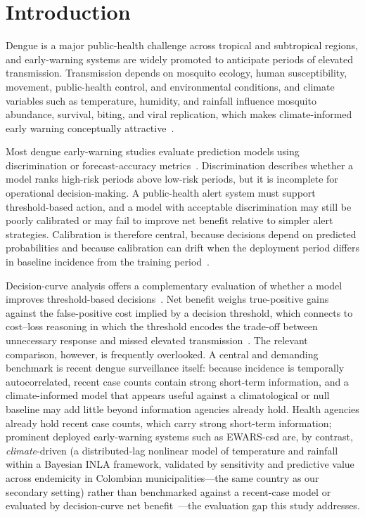 \documentclass[11pt,a4paper]{article}
\begin{document}
\section{Introduction}

Dengue is a major public-health challenge across tropical and subtropical regions, and early-warning systems are widely promoted to anticipate periods of elevated transmission. Transmission depends on mosquito ecology, human susceptibility, movement, public-health control, and environmental conditions, and climate variables such as temperature, humidity, and rainfall influence mosquito abundance, survival, biting, and viral replication, which makes climate-informed early warning conceptually attractive~\cite{Mordecai2017,Huber2018}.

Most dengue early-warning studies evaluate prediction models using discrimination or forecast-accuracy metrics~\cite{Johansson2019,Baharom2022,HussainAlkhateeb2021,Lowe2021}. Discrimination describes whether a model ranks high-risk periods above low-risk periods, but it is incomplete for operational decision-making. A public-health alert system must support threshold-based action, and a model with acceptable discrimination may still be poorly calibrated or may fail to improve net benefit relative to simpler alert strategies. Calibration is therefore central, because decisions depend on predicted probabilities and because calibration can drift when the deployment period differs in baseline incidence from the training period~\cite{VanCalster2019,VanCalster2023,SteyerbergVergouwe2014}.

Decision-curve analysis offers a complementary evaluation of whether a model improves threshold-based decisions~\cite{Vickers2006,Vickers2016,Vickers2019}. Net benefit weighs true-positive gains against the false-positive cost implied by a decision threshold, which connects to cost--loss reasoning in which the threshold encodes the trade-off between unnecessary response and missed elevated transmission~\cite{Murphy1985,Tozan2023}. The relevant comparison, however, is frequently overlooked. A central and demanding benchmark is recent dengue surveillance itself: because incidence is temporally autocorrelated, recent case counts contain strong short-term information, and a climate-informed model that appears useful against a climatological or null baseline may add little beyond information agencies already hold. Health agencies already hold recent case counts, which carry strong short-term information; prominent deployed early-warning systems such as EWARS-csd are, by contrast, \emph{climate}-driven (a distributed-lag nonlinear model of temperature and rainfall within a Bayesian INLA framework, validated by sensitivity and predictive value across endemicity in Colombian municipalities---the same country as our secondary setting) rather than benchmarked against a recent-case model or evaluated by decision-curve net benefit~\cite{EWARScsd}---the evaluation gap this study addresses.
\end{document}
